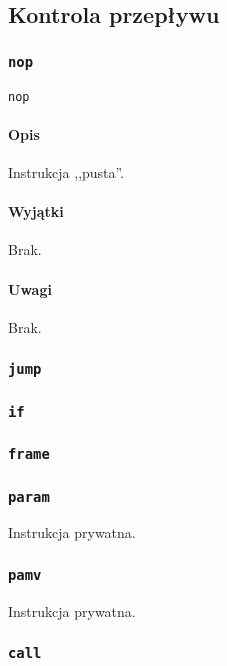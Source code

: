\subsection{Kontrola przepływu}
\label{viua_vm_ops_control_flow}

\subsubsection{\texttt{nop}}

\begin{lstlisting}
nop
\end{lstlisting}

\paragraph*{Opis} Instrukcja ,,pusta''.

\paragraph*{Wyjątki} Brak.

\paragraph*{Uwagi} Brak.

\subsubsection{\texttt{jump}}
\subsubsection{\texttt{if}}

\subsubsection{\texttt{frame}}
\subsubsection{\texttt{param}}

Instrukcja prywatna.

\subsubsection{\texttt{pamv}}

Instrukcja prywatna.

\subsubsection{\texttt{call}}
